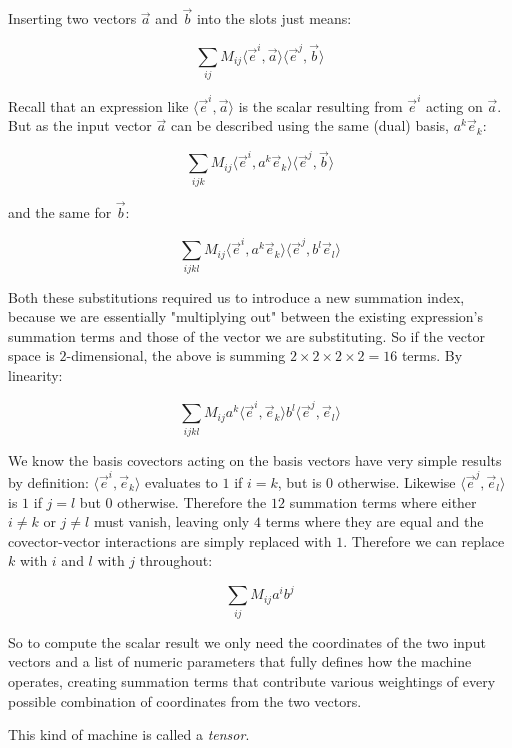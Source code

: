 Inserting two vectors $\vec{a}$ and $\vec{b}$ into the slots just means:

$$
\sum_{ij} M_{ij} \langle \vec{e}^i,\vec{a} \rangle \langle \vec{e}^j,\vec{b} \rangle
$$

Recall that an expression like $\langle \vec{e}^i,\vec{a} \rangle$ is the scalar resulting from $\vec{e}^i$ acting on $\vec{a}$. But as the input vector $\vec{a}$ can be described using the same (dual) basis, $a^k \vec{e}_k$: 

$$
\sum_{ijk} M_{ij} \langle \vec{e}^i, a^k \vec{e}_k \rangle \langle \vec{e}^j,\vec{b} \rangle
$$

and the same for $\vec{b}$:

$$
\sum_{ijkl} M_{ij} \langle \vec{e}^i, a^k \vec{e}_k \rangle \langle \vec{e}^j,b^l \vec{e}_l \rangle
$$

Both these substitutions required us to introduce a new summation index, because we are essentially "multiplying out" between the existing expression's summation terms and those of the vector we are substituting. So if the vector space is $2$-dimensional, the above is summing $2 \times 2 \times 2 \times 2 = 16$ terms. By linearity:

$$
\sum_{ijkl} M_{ij} a^k \langle \vec{e}^i, \vec{e}_k \rangle b^l \langle \vec{e}^j, \vec{e}_l \rangle
$$

We know the basis covectors acting on the basis vectors have very simple results by definition: $\langle \vec{e}^i, \vec{e}_k \rangle$ evaluates to $1$ if $i = k$, but is $0$ otherwise. Likewise $\langle \vec{e}^j, \vec{e}_l \rangle$ is $1$ if $j = l$ but $0$ otherwise. Therefore the $12$ summation terms where either $i \ne k$ or $j \ne l$ must vanish, leaving only $4$ terms where they are equal and the covector-vector interactions are simply replaced with $1$. Therefore we can replace $k$ with $i$ and $l$ with $j$ throughout:

\begin{equation}
    \sum_{ij} M_{ij} a^i b^j
        \label{eqn:two-slot-computation}
\end{equation}

So to compute the scalar result we only need the coordinates of the two input vectors and a list of numeric parameters that fully defines how the machine operates, creating summation terms that contribute various weightings of every possible combination of coordinates from the two vectors.

This kind of machine is called a \textit{tensor}.

